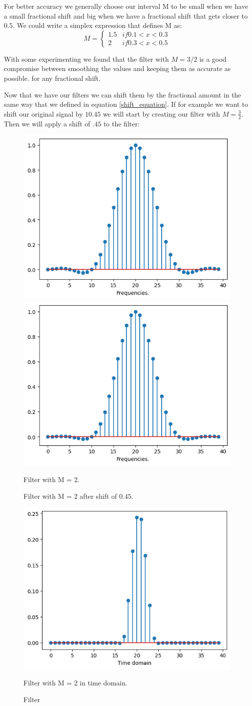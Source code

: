 \documentclass[]{usiinfbachelorproject}
\begin{document}
		For better accuracy we generally choose our interval M to be small when we have a small fractional shift and big when we have a fractional shift that gets closer to $0.5$. We could write a simplex expression that defines M as:
		\begin{equation*}
			M = 
			\begin{cases}
				1.5 & if 0.1 < x < 0.3\\
				2 & if 0.3 < x < 0.5
			\end{cases}
		\end{equation*}
				
		With some experimenting we found that the filter with $M=3/2$ is a good compromise between smoothing the values and keeping them as accurate as possible. for any fractional shift. 
		
	
		Now that we have our filters we can shift them by the fractional amount in the same way that we defined in equation \ref{shift_equation}. If for example we want to shift our original signal by $10.45$ we will start by creating our filter with $M=\frac{3}{2}$. Then we will apply a shift of $.45$ to the filter:
		
		
		
		\begin{figure}[h]
			\centering
			\includegraphics[width=0.4\columnwidth]{images/filter_m_2.png} \hfill		\includegraphics[width=0.4\columnwidth]{images/filter_m_2_shift.png} \\
			\parbox{0.4\columnwidth}{\centering Filter with M = 2.} \hfill
			\parbox{0.4\columnwidth}{\centering Filter with M = 2 after shift of $0.45$.}
			\centering
			\includegraphics[width=0.4\columnwidth]{images/inverse_filter_m_2_shift.png} \\
			\parbox{0.4\columnwidth}{\centering Filter with M = 2 in time domain.}\hfill
			\caption{Filter}
			\label{shift}
		\end{figure}
		
\end{document}

